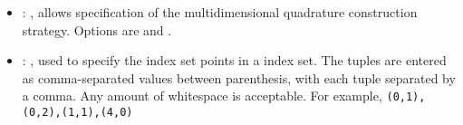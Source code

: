 \begin{itemize}
    \item {}: ,
      allows specification of the multidimensional
      quadrature construction strategy.  Options are  and .

    \item {}: ,
      used to specify the index set points in a  index set.  The tuples are
      entered as comma-separated values between parenthesis, with each tuple separated by a comma.
      Any amount of whitespace is acceptable.  For example,
      \verb'(0,1),(0,2),(1,1),(4,0)'


\end{itemize}
